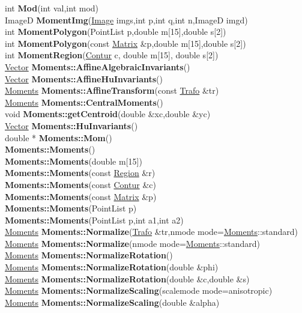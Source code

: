 \documentclass[10pt,titlepage]{article}
\def\functionlistentry#1#2#3#4#5#6{\noindent #1 {\bf #2}(#3) \dotfill #6\\}
\def\letterref#1{}
\def\letterlabelend#1{}
\begin{document}
{{\letterref{Ma}
\letterref{Me}
\letterref{Mi}
\letterref{Mk}
\letterref{Mo}
\letterref{Mp}
\letterref{Mu}
\letterlabelend{Mo}
\functionlistentry{int}{Mod}{int val,int mod}{1357}{numeric}{}
\functionlistentry{ImageD}{MomentImg}{\hyperlink{Image}{Image} imgs,int p,int q,int n,ImageD imgd}{1230}{signalTrafo}{}
\functionlistentry{int}{MomentPolygon}{PointList p,double m[15],double s[2]}{1603}{obsolet}{}
\functionlistentry{int}{MomentPolygon}{const \hyperlink{Matrix}{Matrix} \&p,double m[15],double s[2]}{1604}{obsolet}{}
\functionlistentry{int}{MomentRegion}{\hyperlink{Contur}{Contur} c, double m[15], double s[2]}{1606}{obsolet}{}
\functionlistentry{\hyperlink{Vector}{Vector}}{Moments::AffineAlgebraicInvariants}{}{821}{moments}{}
\functionlistentry{\hyperlink{Vector}{Vector}}{Moments::AffineHuInvariants}{}{823}{moments}{}
\functionlistentry{\hyperlink{Moments}{Moments}}{Moments::AffineTransform}{const \hyperlink{Trafo}{Trafo} \&tr}{820}{moments}{}
\functionlistentry{\hyperlink{Moments}{Moments}}{Moments::CentralMoments}{}{813}{moments}{}
\functionlistentry{void}{Moments::getCentroid}{double \&xc,double \&yc}{812}{moments}{}
\functionlistentry{\hyperlink{Vector}{Vector}}{Moments::HuInvariants}{}{822}{moments}{}
\functionlistentry{double *}{Moments::Mom}{}{810}{moments}{}
\functionlistentry{}{Moments::Moments}{}{803}{moments}{}
\functionlistentry{}{Moments::Moments}{double m[15]}{804}{moments}{}
\functionlistentry{}{Moments::Moments}{const \hyperlink{Region}{Region} \&r}{805}{moments}{}
\functionlistentry{}{Moments::Moments}{const \hyperlink{Contur}{Contur} \&c}{806}{moments}{}
\functionlistentry{}{Moments::Moments}{const \hyperlink{Matrix}{Matrix} \&p}{807}{moments}{}
\functionlistentry{}{Moments::Moments}{PointList p}{808}{moments}{}
\functionlistentry{}{Moments::Moments}{PointList p,int a1,int a2}{809}{moments}{}
\functionlistentry{\hyperlink{Moments}{Moments}}{Moments::Normalize}{\hyperlink{Trafo}{Trafo} \&tr,nmode mode=\hyperlink{Moments}{Moments}::standard}{837}{moments}{}
\functionlistentry{\hyperlink{Moments}{Moments}}{Moments::Normalize}{nmode mode=\hyperlink{Moments}{Moments}::standard}{838}{moments}{}
\functionlistentry{\hyperlink{Moments}{Moments}}{Moments::NormalizeRotation}{}{834}{moments}{}
\functionlistentry{\hyperlink{Moments}{Moments}}{Moments::NormalizeRotation}{double \&phi}{835}{moments}{}
\functionlistentry{\hyperlink{Moments}{Moments}}{Moments::NormalizeRotation}{double \&c,double \&s}{836}{moments}{}
\functionlistentry{\hyperlink{Moments}{Moments}}{Moments::NormalizeScaling}{scalemode mode=anisotropic}{831}{moments}{}
\functionlistentry{\hyperlink{Moments}{Moments}}{Moments::NormalizeScaling}{double \&alpha}{832}{moments}{}
}}
\end{document}
